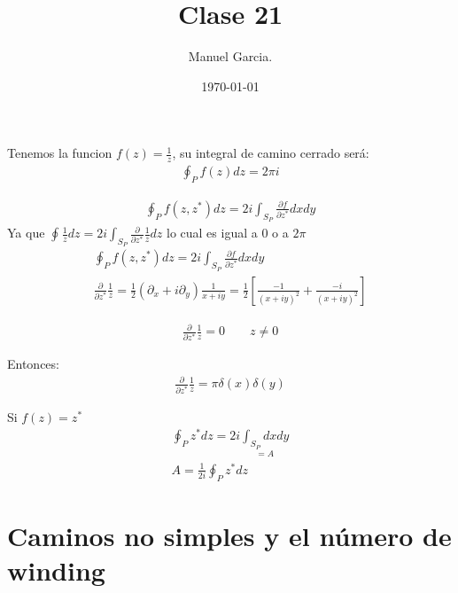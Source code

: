 \documentclass{article}
\title{Clase 21 }
\author{Manuel Garcia.}
\date{\today}
\begin{document}
\maketitle

\section{}
Tenemos la funcion $ f(z) = \frac{1}{z } $, su integral de camino cerrado será: 
\begin{gather*}
  \displaystyle\oint_{P }^{} f(z) dz = 2\pi i 
\end{gather*}

\hfill 

\hfill 

\begin{gather*}
  \displaystyle\oint_{P }^{} f(z,z^*) dz = 2i \displaystyle\int_{S_P }^{} \frac{\partial f  }{\partial z^* }dxdy
\end{gather*}
Ya que $ \displaystyle\oint_{}^{} \frac{1}{z } dz = 2i \displaystyle\int_{S_P }^{} \frac{\partial  }{\partial z^* }\frac{1}{z }dz $ lo cual es igual a $ 0  $ o a $ 2\pi  $
\begin{gather*}
  \displaystyle\oint_{P }^{} f(z,z^*) dz = 2i \displaystyle\int_{S_P }^{} \frac{\partial f  }{\partial z^* }dxdy \\
  \frac{\partial  }{\partial z^* }\frac{1}{z } = \frac{1}{2} (\partial_x + i \partial _y ) \frac{1}{x + i y }  = \frac{1}{2}\left[\frac{-1 }{(x + i y )^2} + \frac{-i }{(x + i y )^2}\right]
\end{gather*}

\begin{gather*}
  \frac{\partial  }{\partial z^* } \frac{1}{z } = 0 \qquad z\neq 0 
\end{gather*}

Entonces: 
\begin{gather*}
  \frac{\partial  }{\partial z^* }\frac{1}{z } = \pi \delta(x) \delta(y) 
\end{gather*}

\hfill 

\hfill 

Si $ f(z) =z^*  $ 
\begin{gather*}
  \displaystyle\oint_{P }^{} z^* dz = 2i \underset{=A }{\displaystyle\int_{S_P }^{}dxdy }\\
  A = \frac{1}{2i }\displaystyle\oint_{P}^{} z^* dz 
\end{gather*}

\section{Caminos no simples y el número de winding }
\end{document}
